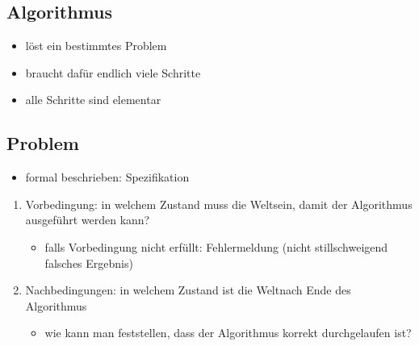 \documentclass[11pt, fleqn]{scrreprt}
\begin{document}
\subsection*{Algorithmus}
	\begin{itemize}[label={-}]
  		\item löst ein bestimmtes Problem
		\item braucht dafür endlich viele Schritte
		\item alle Schritte sind elementar
	\end{itemize}


\subsection*{Problem}
	\begin{itemize}[label={-}]
		\item formal beschrieben: Spezifikation
	\end{itemize} 

	\medskip


	\begin{enumerate}
		\item Vorbedingung: in welchem Zustand muss die \glqq Welt\grqq sein, damit der Algorithmus ausgeführt werden kann?
		\begin{itemize}[label={$\rightarrow$}]
			\item falls Vorbedingung nicht erfüllt: Fehlermeldung (nicht stillschweigend falsches Ergebnis)
		\end{itemize}
		\item Nachbedingungen: in welchem Zustand ist die \glqq Welt\grqq nach Ende des Algorithmus
		\begin{itemize}[label={$\rightarrow$}]
			\item wie kann man feststellen, dass der Algorithmus korrekt durchgelaufen ist?
		\end{itemize}
	\end{enumerate}

	\medskip
\end{document}
